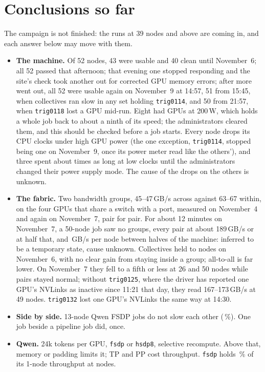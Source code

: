 \section{Conclusions so far}
\label{sec:conclusion}

The campaign is not finished: the runs at 39 nodes and above are coming in, and each answer below may move with them.

\begin{itemize}[leftmargin=*, itemsep=2pt]
  \item \textbf{The machine.} Of 52 nodes, 43 were usable and 40 clean until November~6; all 52 passed that afternoon; that evening one stopped responding and the site's check took another out for corrected GPU memory errors; after more went out, all 52 were usable again on November~9 at 14:57, 51 from 15:45, when collectives ran slow in any set holding \texttt{trig0114}, and 50 from 21:57, when \texttt{trig0118} lost a GPU mid-run. Eight had GPUs at 200\,W, which holds a whole job back to about a ninth of its speed; the administrators cleared them, and this should be checked before a job starts. Every node drops its CPU clocks under high GPU power (the one exception, \texttt{trig0114}, stopped being one on November~9, once its power meter read like the others'), and three spent about \TriProbeSlowRatio{} times as long at low clocks until the administrators changed their power supply mode. The cause of the drops on the others is unknown.
  \item \textbf{The fabric.} Two bandwidth groups, 45--47\,GB/s across against 63--67 within, on the four GPUs that share a switch with a port, measured on November~4 and again on November~7, pair for pair. For about 12 minutes on November~7, a 50-node job saw no groups, every pair at about 189\,GB/s or at half that, and \TriBisection\,GB/s per node between halves of the machine: inferred to be a temporary state, cause unknown. Collectives held to \TriNetInsideTop{} nodes on November~6, with no clear gain from staying inside a group; all-to-all is far lower. On November~7 they fell to a fifth or less at 26 and 50 nodes while pairs stayed normal; without \texttt{trig0125}, where the driver has reported one GPU's NVLinks as inactive since 11:21 that day, they read 167--173\,GB/s at 49 nodes. \texttt{trig0132} lost one GPU's NVLinks the same way at 14:30.
  \item \textbf{Side by side.} 13-node Qwen FSDP jobs do not slow each other (\TriInterferencePct\,\%). One job beside a pipeline job did, once.
  \item \textbf{Qwen.} 24k tokens per GPU, \texttt{fsdp} or \texttt{hsdp8}, selective recompute. Above that, memory or padding limits it; TP and PP cost throughput. \texttt{fsdp} holds \TriWeakFEffOne\,\% of its 1-node throughput at \TriWeakFTop{} nodes.

\end{itemize}
